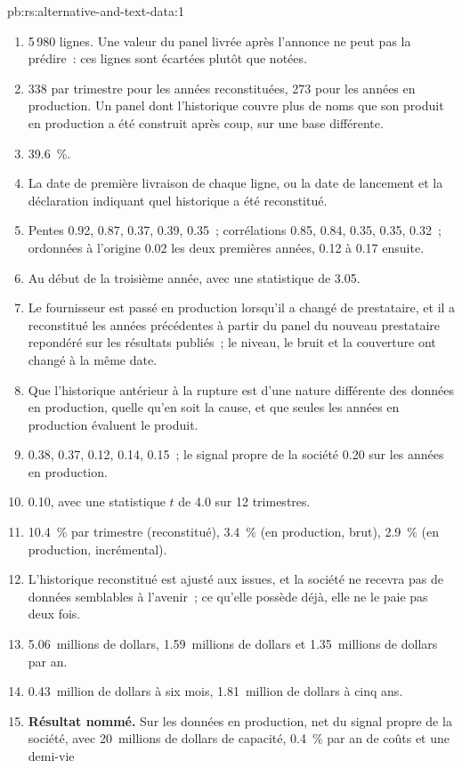\begin{solution}{pb:rs:alternative-and-text-data:1}
\begin{enumerate}
\item 5\,980 lignes. Une valeur du panel livrée après l'annonce ne peut pas la prédire~: ces lignes sont écartées plutôt que notées.
\item 338 par trimestre pour les années reconstituées, 273 pour les années en production. Un panel dont l'historique couvre plus de noms que son produit en production
a été construit après coup, sur une base différente.
\item 39.6~\%.
\item La date de première livraison de chaque ligne, ou la date de lancement et la déclaration indiquant quel historique a été reconstitué.
\item Pentes 0.92, 0.87, 0.37, 0.39, 0.35~; corrélations 0.85, 0.84, 0.35, 0.35, 0.32~; ordonnées à l'origine 0.02 les deux premières années, 0.12 à 0.17 ensuite.
\item Au début de la troisième année, avec une statistique de 3.05.
\item Le fournisseur est passé en production lorsqu'il a changé de prestataire, et il a reconstitué les années précédentes à partir du panel du nouveau prestataire repondéré
sur les résultats publiés~; le niveau, le bruit et la couverture ont changé à la même date.
\item Que l'historique antérieur à la rupture est d'une nature différente des données en production, quelle qu'en soit la cause, et que seules les années en production
évaluent le produit.
\item 0.38, 0.37, 0.12, 0.14, 0.15~; le signal propre de la société 0.20 sur les années en production.
\item 0.10, avec une statistique $t$ de 4.0 sur 12 trimestres.
\item 10.4~\% par trimestre (reconstitué), 3.4~\% (en production, brut), 2.9~\% (en production, incrémental).
\item L'historique reconstitué est ajusté aux issues, et la société ne recevra pas de données semblables à l'avenir~; ce qu'elle possède déjà, elle ne le paie pas deux fois.
\item 5.06~millions de dollars, 1.59~millions de dollars et 1.35~millions de dollars par an.
\item 0.43~million de dollars à six mois, 1.81~million de dollars à cinq ans.
\item \textbf{Résultat nommé.} Sur les données en production, net du signal propre de la société, avec 20~millions de dollars de capacité, 0.4~\% par an de coûts et une demi-vie

\end{enumerate}
\end{solution}

